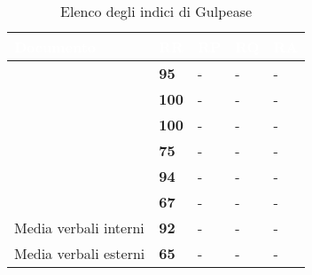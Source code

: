 \renewcommand{\arraystretch}{1.5}
\centering
\begin{longtable}{C{4cm} C{1cm} C{1cm} C{1cm} C{1cm}}
\caption{Elenco degli indici di Gulpease }\\
\textcolor{white}{\textbf{Documento}} & \textcolor{white}{\textbf{RR}} &
\textcolor{white}{\textbf{RP}} & \textcolor{white}{\textbf{RQ}} & 
\textcolor{white}{\textbf{RA}} \\
\hline
\endhead
{} & \textcolor{verde}{\textbf{95}} & - & - & -\\
 & \textcolor{verde}{\textbf{100}} & - & - & -\\
 & \textcolor{verde}{\textbf{100}} & - & - & - \\

 & \textcolor{giallo}{\textbf{75}} & - & - & -\\
 & \textcolor{verde}{\textbf{94}} & - & - & -\\

 & \textcolor{giallo}{\textbf{67}} & - & - & -\\

Media verbali interni & \textcolor{verde}{\textbf{92}} & - & - & -\\
Media verbali esterni & \textcolor{giallo}{\textbf{65}} & - & - & -\\

\end{longtable}



